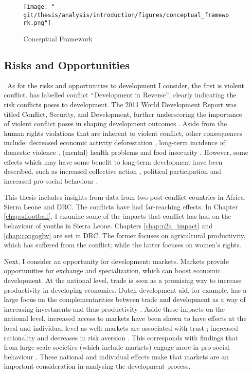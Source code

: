 \begin{figure}[htb]
  \centering
  \texttt{[image: "\\git/thesis/analysis/introduction/figures/conceptual\_framework.png"]}
  \caption{Conceptual Framework}
  \label{intro:fig:framework}
\end{figure}

\subsection{Risks and Opportunities}\
As for the risks and opportunities to development I consider, the first is violent conflict. \citet{Collier2003} has labelled conflict ``Development in Reverse'', clearly indicating the risk conflicts poses to development. The 2011 World Development Report was titled Conflict, Security, and Development, further underscoring the importance of violent conflict poses in shaping development outcomes \citep{WorldBank2011}. Aside from the human rights violations that are inherent to violent conflict, other consequences include: decreased economic activity \citep{Collier1999} deforestation \cite[e.g.][]{Connectiona}, long-term incidence of domestic violence \citep[e.g.][]{LaMattina2017, Muller2019}, (mental) health problems \cite[e.g.][]{Smith2002, Iqbal2006a,Akresh2011} and food insecurity \cite[e.g.][]{Lecoutere2005, Verwimp2012}. However, some effects which may have some benefit to long-term development have been described, such as increased collective action \citep{Bellows2009b}, political participation \citep{Blattman2009a} and increased pro-social behaviour \citep{Voors2012a}.

This thesis includes insights from data from two post-conflict countries in Africa: Sierra Leone and DRC. The conflicts have had far-reaching effects. In Chapter \ref{chap:slfootball}, I examine some of the impacts that conflict has had on the behaviour of youths in Sierra Leone. Chapters \ref{chap:n2a_impact} and \ref{chap:congogbv} are set in DRC. The former focuses on agricultural productivity, which has suffered from the conflict; while the latter focuses on women's rights.

Next, I consider an opportunity for development: markets. Markets provide opportunities for exchange and specialization, which can boost economic development. At the national level, trade is seen as a promising way to increase productivity in developing economies. Dutch development aid, for example, has a large focus on the complementarities between trade and development as a way of increasing investments and thus productivity \citep[see e.g.][]{Zoomers2014}. Aside these impacts on the national level, increased access to markets have been shown to have effects at the local and individual level as well: markets are associated with trust \citep{Tu2010,Fischer2008}; increased rationality \citep{List2008,Cecchi2013,Braga2009} and decreases in risk aversion \citep{Melesse2015}. This corresponds with findings that from large-scale societies (which include markets) engage more in pro-social behaviour \cite{Henrich2005,Henrich2010}. These national and individual effects make that markets are an important consideration in analysing the development process. 

